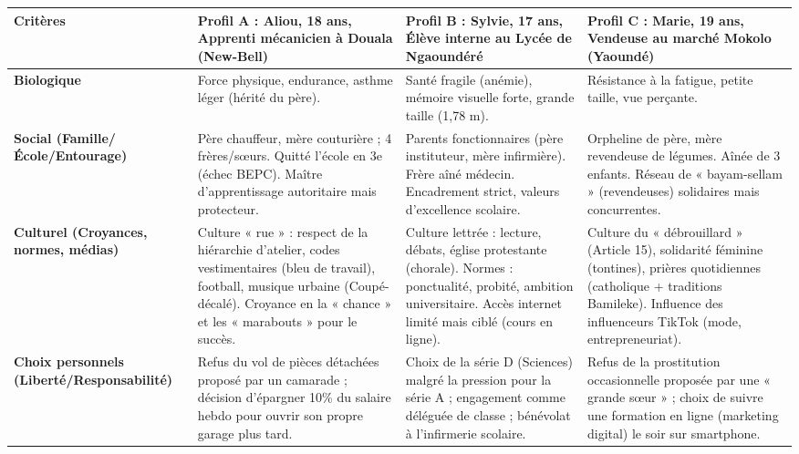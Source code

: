 \documentclass[11pt]{article}
\begin{document}
\begin{center}
\begin{tabularx}{\linewidth}{|l|X|X|X|}\hline
\textbf{Critères} & \textbf{Profil A : Aliou, 18 ans, Apprenti mécanicien à Douala (New-Bell)} & \textbf{Profil B : Sylvie, 17 ans, Élève interne au Lycée de Ngaoundéré} & \textbf{Profil C : Marie, 19 ans, Vendeuse au marché Mokolo (Yaoundé)} \\ \hline
\textbf{Biologique} & Force physique, endurance, asthme léger (hérité du père). & Santé fragile (anémie), mémoire visuelle forte, grande taille (1,78 m). & Résistance à la fatigue, petite taille, vue perçante. \\ \hline
\textbf{Social (Famille/École/Entourage)} & Père chauffeur, mère couturière ; 4 frères/sœurs. Quitté l'école en 3e (échec BEPC). Maître d'apprentissage autoritaire mais protecteur. & Parents fonctionnaires (père instituteur, mère infirmière). Frère aîné médecin. Encadrement strict, valeurs d'excellence scolaire. & Orpheline de père, mère revendeuse de légumes. Aînée de 3 enfants. Réseau de « bayam-sellam » (revendeuses) solidaires mais concurrentes. \\ \hline
\textbf{Culturel (Croyances, normes, médias)} & Culture « rue » : respect de la hiérarchie d'atelier, codes vestimentaires (bleu de travail), football, musique urbaine (Coupé-décalé). Croyance en la « chance » et les « marabouts » pour le succès. & Culture lettrée : lecture, débats, église protestante (chorale). Normes : ponctualité, probité, ambition universitaire. Accès internet limité mais ciblé (cours en ligne). & Culture du « débrouillard » (Article 15), solidarité féminine (tontines), prières quotidiennes (catholique + traditions Bamileke). Influence des influenceurs TikTok (mode, entrepreneuriat). \\ \hline
\textbf{Choix personnels (Liberté/Responsabilité)} & Refus du vol de pièces détachées proposé par un camarade ; décision d'épargner 10\% du salaire hebdo pour ouvrir son propre garage plus tard. & Choix de la série D (Sciences) malgré la pression pour la série A ; engagement comme déléguée de classe ; bénévolat à l'infirmerie scolaire. & Refus de la prostitution occasionnelle proposée par une « grande sœur » ; choix de suivre une formation en ligne (marketing digital) le soir sur smartphone. \\ \hline
\end{tabularx}
\end{center}
\end{document}
